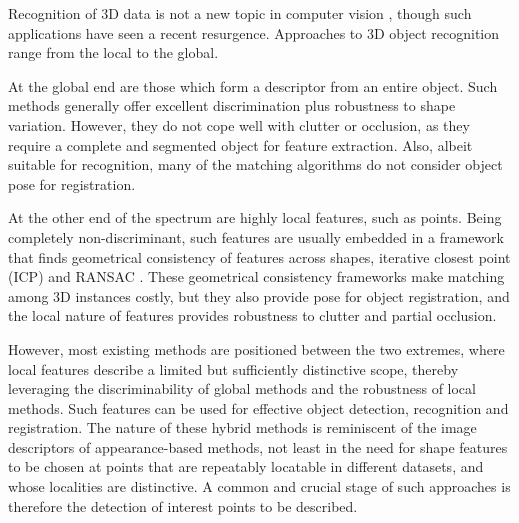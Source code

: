 Recognition of 3D data is not a new topic in computer vision \cite{Fisher1987, Nevatia1977, Marr1978, Bolles1983}, though such applications have seen a recent resurgence. Approaches to 3D object recognition range from the local to the global. 

At the global end are those which form a descriptor from an entire object. Such methods generally offer excellent discrimination plus robustness to shape variation. However, they do not cope well with clutter or occlusion, as they require a complete and segmented object for feature extraction. Also, albeit suitable for recognition, many of the matching algorithms do not consider object pose for registration. 

At the other end of the spectrum are highly local features, such as points. Being completely non-discriminant, such features are usually embedded in a framework that finds geometrical consistency of features across shapes, \eg iterative closest point (ICP) \cite{Besl1992} and RANSAC \cite{Brown2005, Papazov2011}. 
These geometrical consistency frameworks make matching among 3D instances costly, but they also provide pose for object registration, and the local nature of features provides robustness to clutter and partial occlusion. 

However, most existing methods are positioned between the two extremes, where local features describe a limited but sufficiently distinctive scope, thereby leveraging the discriminability of global methods and the robustness of local methods. 
Such features can be used for effective object detection, recognition and registration. The nature of these hybrid methods is reminiscent of the image descriptors of appearance-based methods, not least in the need for shape features to be chosen at points that are repeatably locatable in different datasets, and whose localities are distinctive. 
A common and crucial stage of such approaches is therefore the detection of interest points to be described.  

